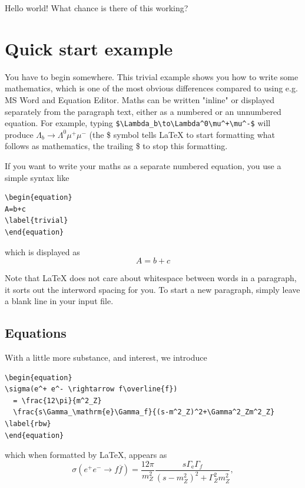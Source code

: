 \documentclass[a4paper,12pt]{article}
\begin{document}
Hello world! What chance is there of this working?

\section{Quick start example}
\label{mystart} %
You have to begin somewhere.  This trivial example shows you how to
write some mathematics, which is one of the most obvious differences compared to using e.g. MS Word and Equation Editor.  Maths can be written "inline" or displayed separately from the paragraph text, either as a numbered or an unnumbered equation.
For example,  typing
\verb=$\Lambda_b\to\Lambda^0\mu^+\mu^-$= will produce
$\Lambda_b\to\Lambda^0\mu^+\mu^- $ (the \$ symbol tells LaTeX to start
formatting what follows as mathematics, the trailing \$ to stop this
formatting.

If you want to write your maths as a separate numbered equation, you use a simple syntax like
\begin{verbatim}
\begin{equation}
A=b+c
\label{trivial}
\end{equation}
\end{verbatim}

which is displayed as 
\begin{equation}
A=b+c
\label{trivial}
\end{equation}

Note that LaTeX does not care about whitespace between words in a paragraph, it sorts out the interword spacing for you.  To start a new paragraph, simply leave a blank line in your input file. 


\subsection{Equations}
\label{my_subsection}
With a little more substance, and interest, we introduce

\begin{verbatim}
\begin{equation}
\sigma(e^+ e^- \rightarrow f\overline{f})
  = \frac{12\pi}{m^2_Z}
  \frac{s\Gamma_\mathrm{e}\Gamma_f}{(s-m^2_Z)^2+\Gamma^2_Zm^2_Z}
\label{rbw}
\end{equation}
\end{verbatim} %
which when formatted by LaTeX, appears as 
\begin{equation}
\sigma(e^+ e^- \rightarrow f\overline{f})
  = \frac{12\pi}{m^2_Z}
  \frac{s\Gamma_\mathrm{e}\Gamma_f}{(s-m^2_Z)^2+\Gamma^2_Zm^2_Z},
\label{rbw}
\end{equation}
\end{document}
